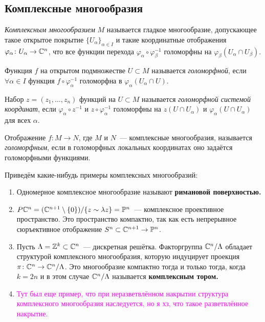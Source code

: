     \subsection{Комплексные многообразия}

    \begin{definition}
        \emph{Комплексным многообразием} $M$ называется гладкое многообразие, допускающее
        такое открытое покрытие $\{ U_{\alpha} \}_{\alpha \in I}$ и такие координатные отображения
        $\varphi_{\alpha}\colon U_{\alpha} \to \mathbb{C}^n$, что все функции перехода $\varphi_{\alpha} \circ \varphi_{\beta}^{-1}$
        голоморфны на $\varphi_{\beta}(U_{\alpha} \cap U_{\beta})$.

        Функция $f$ на открытом подмножестве $U \subset M$ называется \emph{голоморфной}, если $\forall \alpha \in I$
        функция $f \circ \varphi^{-1}_{\alpha}$ голоморфна в $\varphi_{\alpha}(U_{\alpha} \cap U)$.

        Набор $z = (z_1, \ldots, z_n)$ функций на $U \subset M$ называется \emph{голоморфной системой координат}, если $\varphi_{\alpha} \circ z^{-1}$ и $z \circ \varphi^{-1}_{\alpha}$ голоморфны на $z(U \cap U_{\alpha})$ и $\varphi_{\alpha}(U \cap U_{\alpha})$
        для всех $\alpha$.

        Отображение $f\colon M \to N$, где $M$ и $N$~--- комплексные многообразия, называется \emph{голоморфным}, если в голоморфных локальных координатах оно
        задаётся голоморфными функциями.
    \end{definition}

    \begin{example}
        Приведём какие-нибудь примеры комплексных многообразий:

        \begin{enumerate}
            \item Одномерное комплексное многообразие называют \bf{римановой поверхностью}.

            \item $P\mathbb{C}^n  = (\mathbb{C}^{n + 1}\setminus \{ 0 \})/\{ z \sim \lambda z \} = \mathbb{P}^n$~--- комплексное проективное пространство.
            Это пространство компактно, так как есть непрерывное сюръективное отображение $S^n \subset \mathbb{C}^{n + 1} \to \mathbb{P}^n$.

            \item Пусть $\Lambda = \mathbb{Z}^{k} \subset \mathbb{C}^n$~--- дискретная решётка. Факторгруппа $\mathbb{C}^n/\Lambda$ обладает структурой
            комплексного многообразия, которую индуцирует проекция $\pi\colon \mathbb{C}^n \to \mathbb{C}^n/\Lambda$.
            Это многообразие компактно тогда и только тогда, когда $k = 2n$ и в этом случае $\mathbb{C}^n / \Lambda$ называется \bf{комплексным тором}.

            \item \textcolor{magenta}{Тут был еще пример, что при неразветвлённом накрытии структура комплексного многообразия наследуется, но я хз, что такое разветвлённое накрытие.}
        \end{enumerate}
    \end{example}

